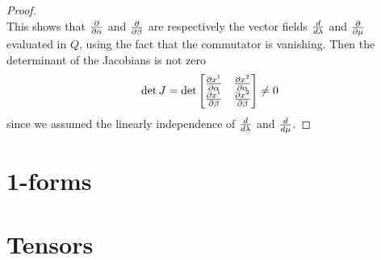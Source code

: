 \begin{proof}
\begin{equation*}
    \end{equation*}
    This shows that $\frac{\partial}{\partial\alpha}$ and $\frac{\partial}{\partial\beta}$ are respectively the vector fields $\frac{d}{d\lambda}$ and $\frac{\partial}{\partial\mu}$ evaluated in $Q$, using the fact that the commutator is vanishing. Then the determinant of the Jacobians is not zero
    \begin{equation*}
        \det J = \det \begin{bmatrix}
            \frac{\partial x^1}{\partial\alpha} & \frac{\partial x^2}{\partial\alpha} \\
            \frac{\partial x^1}{\partial\beta} & \frac{\partial x^2}{\partial\beta} \\
        \end{bmatrix} \neq 0
    \end{equation*}
    since we assumed the linearly independence of $\frac{d}{d\lambda}$ and $\frac{d}{d\mu}$.
    \end{proof} 

\section{1-forms}

    

\section{Tensors}
